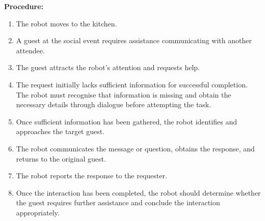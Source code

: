 \medskip
\noindent \textbf{Procedure:}
\begin{enumerate}[nosep]
	\item The robot moves to the kitchen.
	\item A guest at the social event requires assistance communicating with another attendee.
	\item The guest attracts the robot's attention and requests help.
	\item The request initially lacks sufficient information for successful completion. The robot must recognise that information is missing and obtain the necessary details through dialogue before attempting the task.
	\item Once sufficient information has been gathered, the robot identifies and approaches the target guest.
	\item The robot communicates the message or question, obtains the response, and returns to the original guest.
	\item The robot reports the response to the requester.
	\item Once the interaction has been completed, the robot should determine whether the guest requires further assistance and conclude the interaction appropriately.
\end{enumerate}

